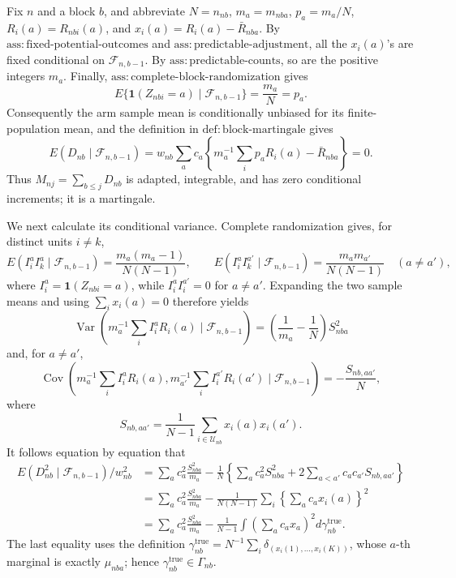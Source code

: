 Fix \(n\) and a block \(b\), and abbreviate \(N=n_{nb}\), \(m_a=m_{nba}\), \(p_a=m_a/N\), \(R_i(a)=R_{nbi}(a)\), and \(x_i(a)=R_i(a)-\bar R_{nba}\).  By \(\mathrm{ass:fixed\text{-}potential\text{-}outcomes}\) and \(\mathrm{ass:predictable\text{-}adjustment}\), all the \(x_i(a)\)'s are fixed conditional on \(\mathcal F_{n,b-1}\).  By \(\mathrm{ass:predictable\text{-}counts}\), so are the positive integers \(m_a\).  Finally, \(\mathrm{ass:complete\text{-}block\text{-}randomization}\) gives
\[
 E\{\mathbf 1(Z_{nbi}=a)\mid\mathcal F_{n,b-1}\}=\frac{m_a}{N}=p_a.
\]
Consequently the arm sample mean is conditionally unbiased for its finite-population mean, and the definition in \(\mathrm{def:block\text{-}martingale}\) gives
\[
 E(D_{nb}\mid\mathcal F_{n,b-1})
 =w_{nb}\sum_a c_a\left\{m_a^{-1}\sum_i p_aR_i(a)-\bar R_{nba}\right\}=0.
\]
Thus \(M_{nj}=\sum_{b\le j}D_{nb}\) is adapted, integrable, and has zero conditional increments; it is a martingale.

We next calculate its conditional variance.  Complete randomization gives, for distinct units \(i\ne k\),
\[
 E(I_i^aI_k^a\mid\mathcal F_{n,b-1})=\frac{m_a(m_a-1)}{N(N-1)},
 \qquad
 E(I_i^aI_k^{a'}\mid\mathcal F_{n,b-1})=\frac{m_am_{a'}}{N(N-1)}\quad(a\ne a'),
\]
where \(I_i^a=\mathbf 1(Z_{nbi}=a)\), while \(I_i^aI_i^{a'}=0\) for \(a\ne a'\).  Expanding the two sample means and using \(\sum_i x_i(a)=0\) therefore yields
\[
 \operatorname{Var}\!\left(m_a^{-1}\sum_iI_i^aR_i(a)\mid\mathcal F_{n,b-1}\right)
 =\left(\frac1{m_a}-\frac1N\right)S_{nba}^2
\]
and, for \(a\ne a'\),
\[
 \operatorname{Cov}\!\left(m_a^{-1}\sum_iI_i^aR_i(a),m_{a'}^{-1}\sum_iI_i^{a'}R_i(a')\mid\mathcal F_{n,b-1}\right)
 =-\frac{S_{nb,aa'}}N,
\]
where
\[
 S_{nb,aa'}=\frac1{N-1}\sum_{i\in\mathcal U_{nb}}x_i(a)x_i(a').
\]
It follows equation by equation that
\[
 \begin{aligned}
 E(D_{nb}^2\mid\mathcal F_{n,b-1})/w_{nb}^2
 &=\sum_a c_a^2\frac{S_{nba}^2}{m_a}
   -\frac1N\left\{\sum_a c_a^2S_{nba}^2+2\sum_{a<a'}c_ac_{a'}S_{nb,aa'}\right\}\\
 &=\sum_a c_a^2\frac{S_{nba}^2}{m_a}
   -\frac1{N(N-1)}\sum_i\left\{\sum_ac_ax_i(a)\right\}^2\\
 &=\sum_a c_a^2\frac{S_{nba}^2}{m_a}
   -\frac1{N-1}\int\left(\sum_ac_ax_a\right)^2d\gamma_{nb}^{\mathrm{true}}.
 \end{aligned}
\]
The last equality uses the definition
\(\gamma_{nb}^{\mathrm{true}}=N^{-1}\sum_i\delta_{(x_i(1),\ldots,x_i(K))}\), whose \(a\)-th marginal is exactly \(\mu_{nba}\); hence \(\gamma_{nb}^{\mathrm{true}}\in\Gamma_{nb}\).

